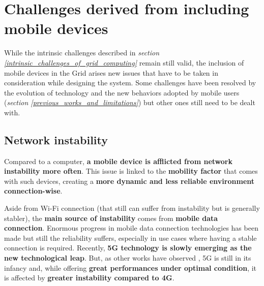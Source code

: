 \section{Challenges derived from including mobile devices}\label{challenges_derived_from_mobile_devides}
While the intrinsic challenges described in \textit{section \ref{intrinsic_challenges_of_grid_computing}} remain still valid, the inclusion of mobile devices in the Grid arises new issues that have to be taken in consideration while designing the system. Some challenges have been resolved by the evolution of technology and the new behaviors adopted by mobile users (\textit{section \ref{previous_works_and_limitations}}) but other ones still need to be dealt with.

\subsection{Network instability}
Compared to a computer, \textbf{a mobile device is afflicted from network instability more often}. This issue is linked to the \textbf{mobility factor} \cite{integrating_mobile_devices_into_grid} that comes with such devices, creating a \textbf{more dynamic and less reliable environment connection-wise}.

Aside from Wi-Fi connection (that still can suffer from instability but is generally stabler), the \textbf{main source of instability} comes from \textbf{mobile data connection}.
Enormous progress in mobile data connection technologies has been made but still the reliability suffers, especially in use cases where having a stable connection is required. Recently, \textbf{5G technology is slowly emerging as the new technological leap}. But, as other works have observed \cite{5g_performances}, 5G is still in its infancy and, while offering \textbf{great performances under optimal condition}, it is affected by \textbf{greater instability compared to 4G}.

